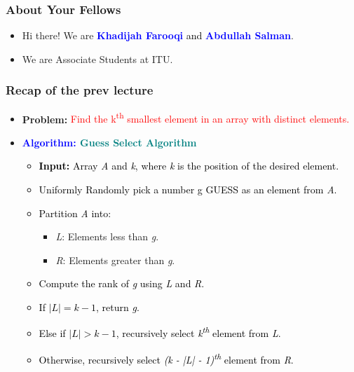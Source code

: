 \setmainfont{Noteworthy}
\begin{frame}
    \frametitle{About Your Fellows}
    \begin{itemize}
        \item Hi there! We are \textcolor{blue}{\textbf{ Khadijah Farooqi}  \textcolor{black}{and}\textbf{ Abdullah Salman}}.
        \item We are Associate Students at ITU.
    \end{itemize}
\end{frame}

\begin{frame}
    \frametitle{Recap of the prev lecture}
    \vspace{0.3cm} %
    \begin{itemize}
        \item \textbf{Problem:} \textcolor{red}{Find the k\textsuperscript{th} smallest element in an array with distinct elements.}
        \vspace{0.3cm} %
        \item \textcolor{blue}{\textbf{Algorithm: \textcolor{teal}{Guess Select Algorithm }}}
        \vspace{0.2cm} %
        \begin{itemize}
            \item \textcolor{black}{\textbf{Input:} Array \textit{A} and \textit{k}, where \textit{k} is the position of the desired element.}
            \item \textcolor{black}{Uniformly Randomly pick a number g GUESS as an element from \textit{A}.}
            \item \textcolor{black}{Partition \textit{A} into:}
            \begin{itemize}
                \item \textit{L}: Elements less than \textit{g}.
                \item \textit{R}: Elements greater than \textit{g}.
            \end{itemize}
            \item \textcolor{black}{Compute the rank of \textit{g} using \textit{L} and \textit{R}.}
            \item \textcolor{black}{If $|L| = k-1$, return \textit{g}.}
            \item \textcolor{black}{Else if $|L| > k-1$, recursively select \textit{k\textsuperscript{th}} element from \textit{L}.}
            \item \textcolor{black}{Otherwise, recursively select \textit{(k - |L| - 1)\textsuperscript{th}} element from \textit{R}.}
        \end{itemize}
    \end{itemize}
    \vspace{0.5cm} %

    
\end{frame}

